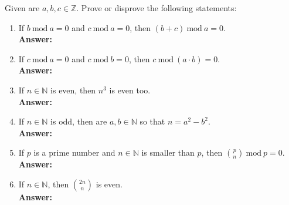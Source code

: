 \documentclass{exercise}
\newcommand{\answer}[1]{\vspace{0.25cm}\\\textbf{Answer:}~#1\vspace{0.25cm}}
\begin{document}
   Given are $a,b, c \in \mathbb{Z}$. Prove or disprove the following statements:
    \begin{enumerate}
      \item If $b\ \mathrm{mod}\ a = 0$ and $c\ \mathrm{mod}\ a = 0$, then $(b + c)\ \mathrm{mod}\ a = 0$.
      \answer{

      }
      
      \item If $c\ \mathrm{mod}\ a = 0$ and $c\ \mathrm{mod}\ b = 0$, then $c\ \mathrm{mod}\ (a\cdot b) = 0$.
      \answer{

      }
      
      \item If $n \in \mathbb{N}$ is even, then $n^3$ is even too.
      \answer{

      }
      
      \item If $n \in \mathbb{N}$ is odd, then are $a, b \in \mathbb{N}$ so that $n = a^2 - b^2$.
      \answer{

      }
      
      \item If $p$ is a prime number and $n \in \mathbb{N}$ is smaller than $p$, then $\binom{p}{n}\ \mathrm{mod}\ p = 0$.
      \answer{

      }
    
      \item If $n \in \mathbb{N}$, then $\binom{2n}{n}$ is even.
      \answer{

      }
      
    \end{enumerate}
\end{document}

